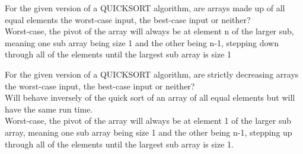 \documentclass[12pt,largemargins]{homework}
\begin{document}
\question
\begin{alphaparts}
	\item For the given version of a QUICKSORT algorithm, are arrays made up of all equal elements the worst-case input, the best-case input or neither?\\
	Worst-case, the pivot of the array will always be at element n of the larger sub, meaning one sub array being size 1 and the other being n-1, stepping down through all of the elements until the largest sub array is size 1
	\item
	For the given version of a QUICKSORT algorithm, are strictly decreasing arrays the worst-case input, the best-case input or neither?\\
	Will behave inversely of the quick sort of an array of all equal elements but will have the same run time.\\
	Worst-case, the pivot of the array will always be at element 1 of the larger sub array, meaning one sub array being size 1 and the other being n-1, stepping up through all of the elements until the largest sub array is size 1.\\
\end{alphaparts}
\question 
\end{document}
